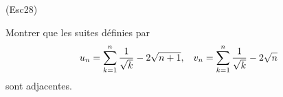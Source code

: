 \begin{tiny}(Esc28)\end{tiny} Montrer que les suites définies par
\begin{displaymath}
 u_n=\sum_{k=1}^n \frac{1}{\sqrt{k}} -2\sqrt{n+1},\hspace{0.3cm}
 v_n=\sum_{k=1}^n \frac{1}{\sqrt{k}} -2\sqrt{n}
\end{displaymath}
sont adjacentes. 